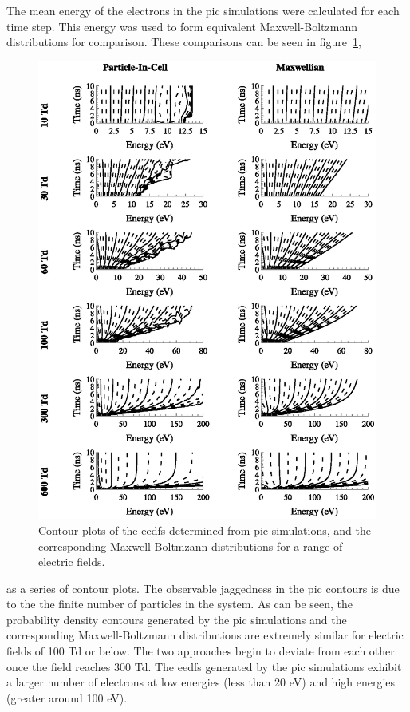 The mean energy of the electrons in the \acs{pic} simulations were calculated
for each time step. This energy was used to form equivalent Maxwell-Boltzmann
distributions for comparison. These comparisons can be seen in
figure~\ref{fig:picmb},
\begin{figure}
  \centering
  \includegraphics{./chapters/modeling/figures/picmb.eps}
  \caption{Contour plots of the \acs{eedf}s determined from \acs{pic}
    simulations, and the corresponding Maxwell-Boltmzann distributions for a range
    of electric fields.}
  \label{fig:picmb}
\end{figure}
as a series of contour plots. The observable jaggedness in the \acs{pic}
contours is due to the the finite number of particles in the system. As can be
seen, the probability density contours generated by the \acs{pic} simulations
and the corresponding Maxwell-Boltzmann distributions are extremely similar for
electric fields of 100 Td or below. The two approaches begin to deviate from
each other once the field reaches 300 Td. The \acs{eedf}s generated by the
\acs{pic} simulations exhibit a larger number of electrons at low energies (less
than 20 eV) and high energies (greater around 100 eV).

